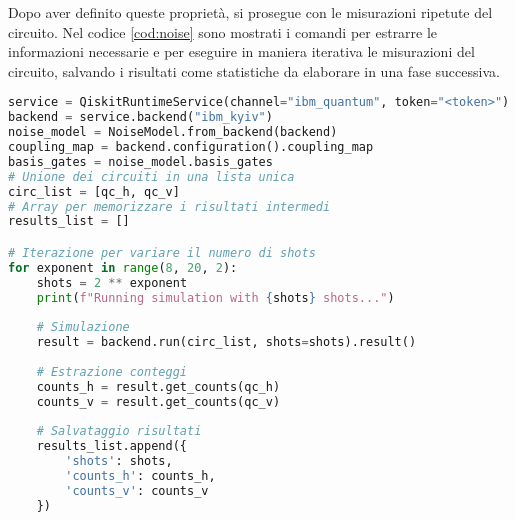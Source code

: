 Dopo aver definito queste proprietà, si prosegue con le misurazioni 
ripetute del circuito. Nel codice \ref{cod:noise} sono mostrati 
i comandi per estrarre le informazioni necessarie e per eseguire 
in maniera iterativa le misurazioni del circuito, salvando i risultati 
come statistiche da elaborare in una fase successiva.

\begin{lstlisting}[language=Python, 
caption={Codice Python per creazione del modello di rumore}, label=cod:noise]
service = QiskitRuntimeService(channel="ibm_quantum", token="<token>")
backend = service.backend("ibm_kyiv")
noise_model = NoiseModel.from_backend(backend)
coupling_map = backend.configuration().coupling_map
basis_gates = noise_model.basis_gates
# Unione dei circuiti in una lista unica
circ_list = [qc_h, qc_v]
# Array per memorizzare i risultati intermedi
results_list = []

# Iterazione per variare il numero di shots
for exponent in range(8, 20, 2):
    shots = 2 ** exponent
    print(f"Running simulation with {shots} shots...")
    
    # Simulazione
    result = backend.run(circ_list, shots=shots).result()
    
    # Estrazione conteggi
    counts_h = result.get_counts(qc_h)
    counts_v = result.get_counts(qc_v)
    
    # Salvataggio risultati 
    results_list.append({
        'shots': shots,
        'counts_h': counts_h,
        'counts_v': counts_v
    })
\end{lstlisting}

